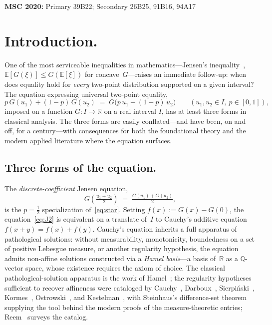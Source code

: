 \documentclass{article}
\theoremstyle{plain}
\theoremstyle{definition}
\newcommand{\R}{\mathbb{R}}
\newcommand{\Q}{\mathbb{Q}}
\newcommand{\E}{\mathbb{E}}
\begin{document}
\noindent\textbf{MSC 2020:} Primary 39B22; Secondary 26B25, 91B16, 94A17

\vspace{8px}

\section{Introduction.}
\label{sec:intro}

One of the most serviceable inequalities in mathematics---Jensen's
inequality~\cite{Jensen1906}, $\E[G(\xi)]\le G(\E[\xi])$ for concave~$G$---raises an
immediate follow-up: when does equality hold for \emph{every} two-point
distribution supported on a given interval? The equation expressing
universal two-point equality,
\begin{equation}
p\,G(u_1)+(1-p)\,G(u_2) \;=\; G\bigl(p\,u_1+(1-p)\,u_2\bigr)
\qquad (u_1,u_2\in I,\ p\in[0,1]),
\tag{$\star$}\label{eq:star}
\end{equation}
imposed on a function $G\colon I\to\R$ on a real interval $I$, has
at least three forms in classical analysis. The three forms are easily
conflated---and have been, on and off, for a century---with consequences
for both the foundational theory and the modern applied literature where
the equation surfaces.

\subsection{Three forms of the equation.}

The \emph{discrete-coefficient} Jensen equation,
\begin{equation}
G\!\left(\tfrac{u_1+u_2}{2}\right) \;=\; \tfrac{G(u_1)+G(u_2)}{2},
\tag{$J_2$}\label{eq:J2}
\end{equation}
is the $p=\tfrac{1}{2}$ specialization of~\eqref{eq:star}. Setting
$f(x):=G(x)-G(0)$, the equation~\eqref{eq:J2} is equivalent on a
translate of~$I$ to Cauchy's additive equation $f(x+y)=f(x)+f(y)$.
Cauchy's equation inherits a full apparatus of pathological solutions:
without measurability, monotonicity, boundedness on a set of positive
Lebesgue measure, or another regularity hypothesis, the equation admits
non-affine solutions constructed via a \emph{Hamel basis}---a basis
of~$\R$ as a $\Q$-vector space, whose existence requires the axiom of
choice. The classical pathological-solution apparatus is the work of
Hamel~\cite{Hamel1905}; the regularity hypotheses sufficient to recover
affineness were cataloged by Cauchy~\cite{Cauchy1821},
Darboux~\cite{Darboux1875,Darboux1880}, Sierpi\'nski~\cite{Sierpinski1920},
Kormes~\cite{Kormes1926}, Ostrowski~\cite{Ostrowski1929}, and
Kestelman~\cite{Kestelman1947}, with Steinhaus's difference-set
theorem~\cite{Steinhaus1920} supplying the tool behind the modern
proofs of the measure-theoretic entries; Reem~\cite{Reem2017} surveys
the catalog.
\end{document}
